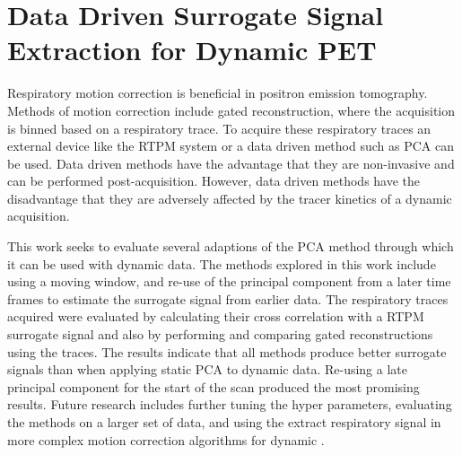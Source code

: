 \chapter{Data Driven Surrogate Signal Extraction for Dynamic PET} \label{sec:data_driven_surrogate_signal_extraction_results}
    \newpage
    
        
    
        Respiratory motion correction is beneficial in positron emission tomography. Methods of motion correction include gated reconstruction, where the acquisition is binned based on a respiratory trace. To acquire these respiratory traces an external device like the \gls{RTPM} system or a data driven method such as \gls{PCA} can be used. Data driven methods have the advantage that they are non-invasive and can be performed post-acquisition. However, data driven methods have the disadvantage that they are adversely affected by the tracer kinetics of a dynamic acquisition.
        
        This work seeks to evaluate several adaptions of the \gls{PCA} method through which it  can be used with dynamic data. The methods explored in this work include using a moving window, and re-use of the principal component from a later time frames to estimate the surrogate signal from earlier data. The respiratory traces acquired were evaluated by calculating their cross correlation with a \gls{RTPM} surrogate signal and also by performing and comparing gated reconstructions using the traces. The results indicate that all methods produce better surrogate signals than when applying static \gls{PCA} to dynamic data. Re-using a late principal component for the start of the scan produced the most promising results. Future research includes further tuning the hyper parameters, evaluating the methods on a larger set of data, and using the extract respiratory signal in more complex motion correction algorithms for dynamic .
        
